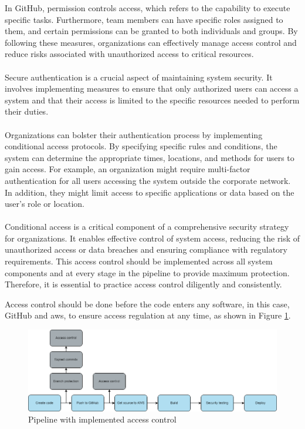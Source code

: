 In GitHub, permission controls access, which refers to the capability to execute specific tasks. Furthermore, team members can have specific roles assigned to them, and certain permissions can be granted to both individuals and groups. By following these measures, organizations can effectively manage access control and reduce risks associated with unauthorized access to critical resources. 
\\~\\
Secure authentication is a crucial aspect of maintaining system security. It involves implementing measures to ensure that only authorized users can access a system and that their access is limited to the specific resources needed to perform their duties.
\\~\\
Organizations can bolster their authentication process by implementing conditional access protocols. By specifying specific rules and conditions, the system can determine the appropriate times, locations, and methods for users to gain access. For example, an organization might require multi-factor authentication for all users accessing the system outside the corporate network. In addition, they might limit access to specific applications or data based on the user's role or location.
\\~\\
Conditional access is a critical component of a comprehensive security strategy for organizations. It enables effective control of system access, reducing the risk of unauthorized access or data breaches and ensuring compliance with regulatory requirements. This access control should be implemented across all system components and at every stage in the pipeline to provide maximum protection. Therefore, it is essential to practice access control diligently and consistently.

Access control should be done before the code enters any software, in this case, GitHub and \acrshort{aws}, to ensure access regulation at any time, as shown in Figure \ref{fig: Pipeline with implemented access control}.

\vspace{2mm}
\begin{figure}[H]
    \centering
    \includegraphics[width=0.8\columnwidth]{Images/pipeline7.png}
    \caption{Pipeline with implemented access control}
    \label{fig: Pipeline with implemented access control}
\end{figure}
 
